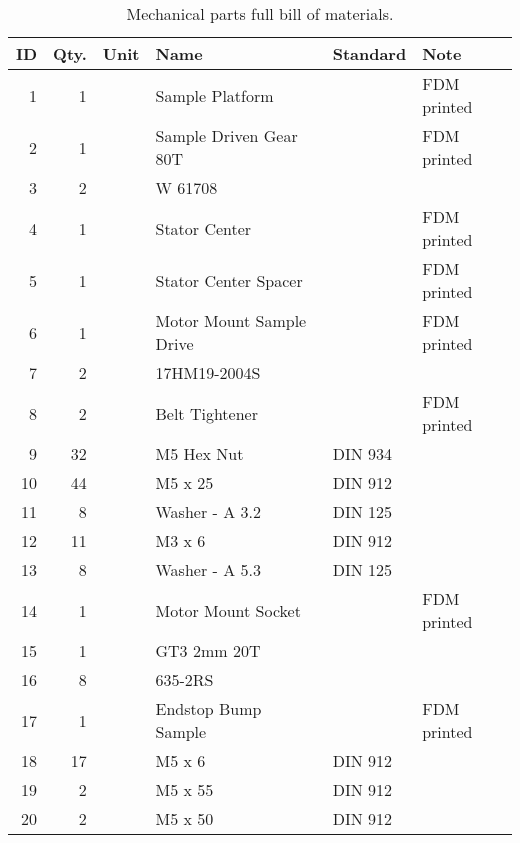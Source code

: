 \begin{table}[!ht]
    \centering
    \caption[Mechanical parts full bill of materials]{Mechanical parts full bill of materials.}
    \label{tab:mech bom}
    \begin{tabular}{@{}rrllll@{}}
        \toprule
        ID&	Qty.&	Unit&	Name&	Standard&	Note\\
        \midrule
        1&	1&	&	Sample Platform                         &	&	FDM printed\\
        2&	1&	&	Sample Driven Gear 80T                  &		&	FDM printed\\
        3&	2&	&	W 61708                                 &	&	    \\
        4&	1&	&	Stator Center                           &	&		FDM printed\\
        5&	1&	&	Stator Center Spacer                    &	&		FDM printed\\
        6&	1&	&	Motor Mount Sample Drive                &	&		FDM printed\\
        7&	2&	&	17HM19-2004S                            &	&		\\
        8&	2&	&	Belt Tightener                          &	&		FDM printed\\
        9&	32&	&	M5 Hex Nut                              &	DIN 934&		\\
        10&	44&	&	M5 x 25                                 &	DIN 912&		\\
        11&	8&	&	Washer - A 3.2                          &	DIN 125&		\\
        12&	11&	&	M3 x 6                                  &	DIN 912&		\\
        13&	8&	&	Washer - A 5.3                          &	DIN 125&		\\
        14&	1&	&	Motor Mount Socket                      &	&		FDM printed\\
        15&	1&	&	GT3 2mm 20T                             &	&		\\
        16&	8&	&	635-2RS                                 &	&		\\
        17&	1&	&	Endstop Bump Sample                     &	&		FDM printed\\
        18&	17&	&	M5 x 6                                  &	DIN 912&		\\
        19&	2&	&	M5 x 55                                 &	DIN 912&		\\
        20&	2&	&	M5 x 50                                 &	DIN 912&		\\

\end{tabular}
\end{table}
